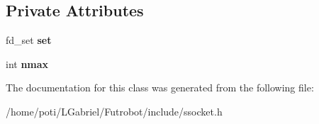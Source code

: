 \subsection*{Private Attributes}
\begin{DoxyCompactItemize}
\item 
fd\+\_\+set {\bfseries set}\hypertarget{classfsocket_a93811aaf957d7663b0b1211e499ff8ee}{}\label{classfsocket_a93811aaf957d7663b0b1211e499ff8ee}

\item 
int {\bfseries nmax}\hypertarget{classfsocket_a8185d8d338137d9d3164d98364ade95b}{}\label{classfsocket_a8185d8d338137d9d3164d98364ade95b}

\end{DoxyCompactItemize}


The documentation for this class was generated from the following file\+:\begin{DoxyCompactItemize}
\item 
/home/poti/\+L\+Gabriel/\+Futrobot/include/ssocket.\+h\end{DoxyCompactItemize}
